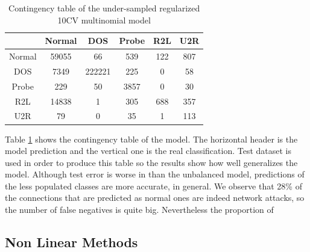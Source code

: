 \documentclass[a4paper]{article} %
\begin{document}
\begin{table}[H]
	\centering
	\begin{tabular}{c | c c c c c}
				& Normal & DOS & Probe & R2L & U2R \\
		\hline
		Normal	& 59055	& 66 	 & 539	 & 122 	& 807 \\
		DOS		& 7349	& 222221 & 225	 & 0  	& 58\\
		Probe	& 229	& 50	 & 3857	 & 0	& 30 \\
		R2L		& 14838	& 1		 & 305   & 688 	& 357\\
		U2R		& 79	& 0		 & 35    & 1 	& 113\\	
	\end{tabular}
	\caption{Contingency table of the under-sampled regularized 10CV multinomial model}
	\label{table:sub10model}
\end{table}

Table \ref{table:sub10model} shows the contingency table of the model. The horizontal header is the model prediction and the vertical one is the real classification. Test dataset is used in order to produce this table so the results show how well generalizes the model. Although test error is worse in than the unbalanced model, predictions of the less populated classes are more accurate, in general. We observe that 28\% of the connections that are predicted as normal ones are indeed network attacks, so the number of false negatives is quite big. Nevertheless the proportion of 
\subsection{Non Linear Methods}


\printbibliography

\end{document}

